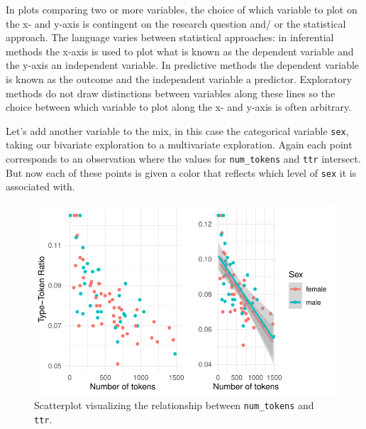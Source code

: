 \documentclass[
  letterpaper,
]{scrbook}
\begin{document}
\begin{tcolorbox}[enhanced jigsaw, title=\textcolor{quarto-callout-warning-color}{\faExclamationTriangle}\hspace{0.5em}{Tip}, titlerule=0mm, toptitle=1mm, colbacktitle=quarto-callout-warning-color!10!white, bottomtitle=1mm, left=2mm, colframe=quarto-callout-warning-color-frame, breakable, toprule=.15mm, colback=white, opacitybacktitle=0.6, leftrule=.75mm, rightrule=.15mm, bottomrule=.15mm, arc=.35mm, coltitle=black, opacityback=0]

In plots comparing two or more variables, the choice of which variable
to plot on the x- and y-axis is contingent on the research question and/
or the statistical approach. The language varies between statistical
approaches: in inferential methods the x-axis is used to plot what is
known as the dependent variable and the y-axis an independent variable.
In predictive methods the dependent variable is known as the outcome and
the independent variable a predictor. Exploratory methods do not draw
distinctions between variables along these lines so the choice between
which variable to plot along the x- and y-axis is often arbitrary.

\end{tcolorbox}

Let's add another variable to the mix, in this case the categorical
variable \texttt{sex}, taking our bivariate exploration to a
multivariate exploration. Again each point corresponds to an observation
where the values for \texttt{num\_tokens} and \texttt{ttr} intersect.
But now each of these points is given a color that reflects which level
of \texttt{sex} it is associated with.

\begin{figure}[h]

{\centering \includegraphics{./approaching-analysis_files/figure-pdf/fig-summaries-multivariate-scatterplot-belc-1.pdf}

}

\caption{\label{fig-summaries-multivariate-scatterplot-belc}Scatterplot
visualizing the relationship between \texttt{num\_tokens} and
\texttt{ttr}.}

\end{figure}
\end{document}
